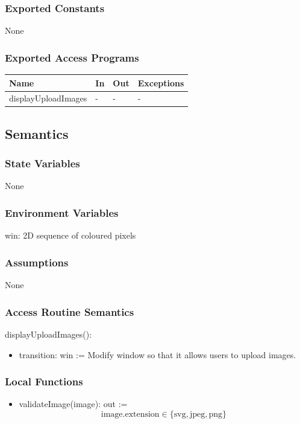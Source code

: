 \documentclass[12pt, titlepage]{article}
\begin{document}
\subsubsection{Exported Constants}
None
\subsubsection{Exported Access Programs}

\begin{center}
\begin{tabular}{p{3cm} p{4cm} p{4cm} p{2cm}}
\hline
\textbf{Name} & \textbf{In} & \textbf{Out} & \textbf{Exceptions} \\
\hline
displayUploadImages & - & - & - \\
\hline
\end{tabular}
\end{center}

\subsection{Semantics}

\subsubsection{State Variables}
None
\subsubsection{Environment Variables}
win: 2D sequence of coloured pixels

\subsubsection{Assumptions}
None

\subsubsection{Access Routine Semantics}

\noindent displayUploadImages():
\begin{itemize}
\item transition: win := Modify window so that it allows users to upload images.
\end{itemize}

\subsubsection{Local Functions}
\begin{itemize}
\item validateImage(image): out := \[
\text{image.extension} \in \{\text{svg}, \text{jpeg}, \text{png}\}
\]
\end{itemize}
\end{document}
